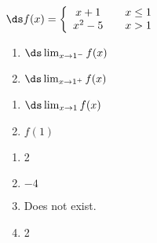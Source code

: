 {$\ds f(x) = \left\{\begin{array}{ccc}
	x+1 & & x\leq 1 \\
	x^2-5 & & x>1
	\end{array}
	\right.
$

\noindent\begin{minipage}[t]{.49\linewidth}
\begin{enumerate}
\item		$\ds \lim_{x\to 1^-} f(x)$
\item		$\ds \lim_{x\to 1^+} f(x)$
\end{enumerate}
\end{minipage}
\noindent\begin{minipage}[t]{.49\linewidth}
\begin{enumerate}\addtocounter{enumii}{2}
\item		$\ds \lim_{x\to 1} f(x)$
\item		$f(1)$\end{enumerate}
\end{minipage}
}
{\begin{enumerate}
\item		2
\item		$-4$
\item		Does not exist.
\item		2
\end{enumerate}
}



